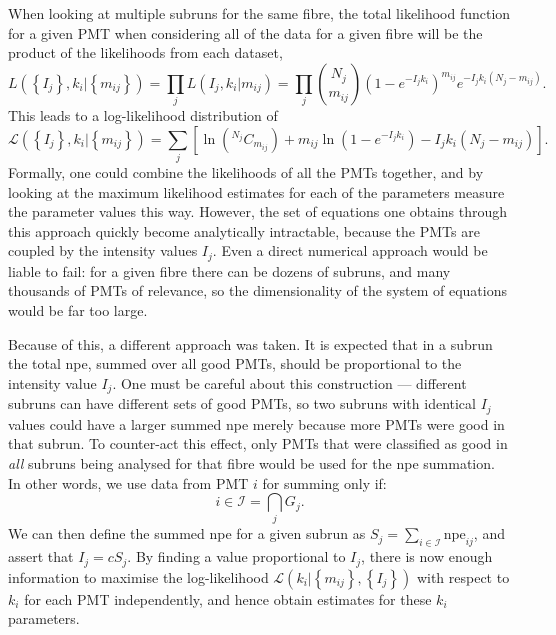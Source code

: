 When looking at multiple subruns for the same fibre, the total likelihood function for a given PMT when considering all of the data for a given fibre will be the product of the likelihoods from each dataset,
\begin{equation}
    L\left(\left\{I_{j}\right\}, k_{i} | \left\{m_{ij}\right\}\right) = \prod_{j} L(I_{j}, k_{i} | m_{ij}) = \prod_{j}\binom{N_{j}}{m_{ij}}\left(1-e^{-I_{j}k_{i}}\right)^{m_{ij}}e^{-I_{j}k_{i}(N_{j}-m_{ij})}.
\end{equation}
This leads to a log-likelihood distribution of
\begin{equation}
    \mathcal{L}\left(\left\{I_{j}\right\}, k_{i} | \left\{m_{ij}\right\}\right) = \sum_{j}\left[\ln\left(^{N_{j}}C_{m_{ij}}\right) + m_{ij}\ln\left(1 - e^{-I_{j}k_{i}}\right) - I_{j}k_{i}\left(N_{j} - m_{ij}\right)\right].
\end{equation}
Formally, one could combine the likelihoods of all the PMTs together, and by looking at the maximum likelihood estimates for each of the parameters measure the parameter values this way. However, the set of equations one obtains through this approach quickly become analytically intractable, because the PMTs are coupled by the intensity values $I_{j}$. Even a direct numerical approach would be liable to fail: for a given fibre there can be dozens of subruns, and many thousands of PMTs of relevance, so the dimensionality of the system of equations would be far too large.

Because of this, a different approach was taken. It is expected that in a subrun the total npe, summed over all good PMTs, should be proportional to the intensity value $I_{j}$. One must be careful about this construction --- different subruns can have different sets of good PMTs, so two subruns with identical $I_{j}$ values could have a larger summed npe merely because more PMTs were good in that subrun. To counter-act this effect, only PMTs that were classified as good in \textit{all} subruns being analysed for that fibre would be used for the npe summation. In other words, we use data from PMT $i$ for summing only if:
\begin{equation}
    i \in \mathcal{I} = \bigcap_{j}G_{j}.
\end{equation}
We can then define the summed npe for a given subrun as $S_{j} = \sum_{i\in\mathcal{I}}\text{npe}_{ij}$, and assert that $I_{j} = cS_{j}$. By finding a value proportional to $I_{j}$, there is now enough information to maximise the log-likelihood $\mathcal{L}\left(k_{i} | \left\{m_{ij}\right\}, \left\{I_{j}\right\}\right)$ with respect to $k_{i}$ for each PMT independently, and hence obtain estimates for these $k_{i}$ parameters.

